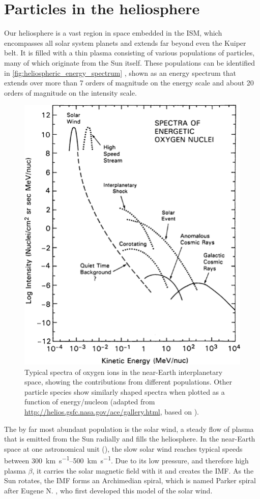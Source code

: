 \section{Particles in the heliosphere}
\label{sec:particles_heliosphere}

Our heliosphere is a vast region in space embedded in the \ac{ISM}, which encompasses all solar system planets and extends far beyond even the Kuiper belt. 
It is filled with a thin plasma consisting of various populations of particles, many of which originate from the Sun itself. These populations can be identified in \autoref{fig:heliospheric_energy_spectrum} \citep[based on measurements by][]{Mewaldt-2001}, shown as an energy spectrum that extends over more than 7 orders of magnitude on the energy scale and about 20 orders of magnitude on the intensity scale.
\begin{figure}
    \centering
    \includegraphics[width=0.6\linewidth]{images/heliospheric_energy_spectrum}
    \caption[Spectra of oxygen ions in the near-Earth interplanetary space]{Typical spectra of oxygen ions in the near-Earth interplanetary space, showing the contributions from different populations. Other particle species show similarly shaped spectra when plotted as a function of energy/nucleon (adapted from \url{http://helios.gsfc.nasa.gov/ace/gallery.html}, based on \cite{Mewaldt-2001}).}
    \label{fig:heliospheric_energy_spectrum}
\end{figure}
The by far most abundant population is the solar wind, a steady flow of plasma that is emitted from the Sun radially and fills the heliosphere. 
In the near-Earth space at one astronomical unit (\si{\AU}), the slow solar wind reaches typical speeds between \SIrange[range-phrase={\,and\,}]{300}{500}{\kilo\meter\per\second}.
Due to its low pressure, and therefore high plasma $\beta$, it carries the solar magnetic field with it and creates the \ac{IMF}.
As the Sun rotates, the \ac{IMF} forms an Archimedian spiral, which is named Parker spiral after Eugene N. \citet{Parker-1958}, who first developed this model of the solar wind.

